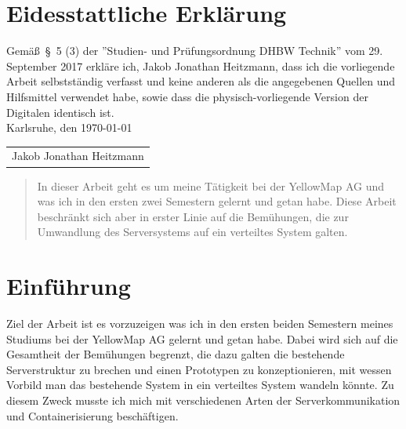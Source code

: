\documentclass[12pt,a4paper]{article}
\begin{document}

\section*{Eidesstattliche Erkl\"arung}

Gem\"a\ss\ \S\ 5 (3) der ''Studien- und Pr\"ufungsordnung DHBW Technik'' vom 29. September 2017 erkl\"are ich, Jakob Jonathan Heitzmann, dass ich die vorliegende Arbeit selbstst\"andig verfasst und keine anderen als die angegebenen Quellen und Hilfsmittel verwendet habe, sowie dass die physisch-vorliegende Version der Digitalen identisch ist.\\
\hspace*{0.5cm}
Karlsruhe, den \today

\vspace*{2cm}

\begin{tabular}{@{}l@{}}\hline
\rule{0pt}{2ex}
Jakob Jonathan Heitzmann
\end{tabular}
\newpage


\begin{abstract}
In dieser Arbeit geht es um meine Tätigkeit bei der YellowMap AG und was ich in den ersten zwei Semestern gelernt und getan habe. Diese Arbeit beschränkt sich aber in erster Linie auf die Bemühungen, die zur Umwandlung des Serversystems auf ein verteiltes System galten.
\end{abstract}
\newpage

\tableofcontents
\newpage


\section{Einf\"uhrung}
Ziel der Arbeit ist es vorzuzeigen was ich in den ersten beiden Semestern meines Studiums bei der YellowMap AG gelernt und getan habe. Dabei wird sich auf die Gesamtheit der Bemühungen begrenzt, die dazu galten die bestehende Serverstruktur zu brechen und einen Prototypen zu konzeptionieren, mit wessen Vorbild man das bestehende System in ein verteiltes System wandeln könnte. Zu diesem Zweck musste ich mich mit verschiedenen Arten der Serverkommunikation und Containerisierung beschäftigen.
\end{document}
